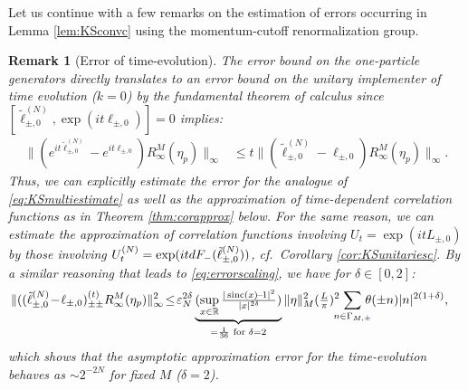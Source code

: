 \documentclass[a4paper, 11pt]{article}
\DeclareMathOperator{\1}{\mathds{1}}
\DeclareMathOperator{\sinc}{sinc}
\newtheorem{rem}[thm]{Remark}
\begin{document}
Let us continue with a few remarks on the estimation of errors occurring in Lemma \ref{lem:KSconvc} using the momentum-cutoff renormalization group.	
\begin{rem}[Error of time-evolution]
\label{rem:timeerror}
The error bound on the one-particle generators directly translates to an error bound on the unitary implementer of time evolution ($k=0$) by the fundamental theorem of calculus since $[\tilde{\ell}^{(N)}_{\pm,0},\exp(it\ell_{\pm,0})]=0$ implies:
\begin{align}
\label{eq:momrgestimatetime}
\|(e^{it\tilde{\ell}^{(N)}_{\pm,0}}-e^{it\ell_{\pm,0}})R^{M}_{\infty}(\eta_{p})\|_{\infty} & \leq t \|(\tilde{\ell}^{(N)}_{\pm,0}-\ell_{\pm,0})R^{M}_{\infty}(\eta_{p})\|_{\infty}.
\end{align}
Thus, we can explicitly estimate the error for the analogue of \eqref{eq:KSmultiestimate} as well as the approximation of time-dependent correlation functions as in Theorem \ref{thm:corapprox} below. For the same reason, we can estimate the approximation of correlation functions involving $U_{t}=\exp(itL_{\pm,0})$ by those involving $U^{(N)}_{t}=\exp(itdF_{{\color{blue}-}}(\tilde{\ell}^{(N)}_{\pm,0}))$, cf.~Corollary \ref{cor:KSunitariesc}. By a similar reasoning that leads to \eqref{eq:errorscaling}, we have for $\delta\in[0,2]$:
\begin{align}
\label{eq:momrgtimeerrorscaling}
\|((\tilde{\ell}^{(N)}_{\pm,0}\!-\!\ell_{\pm,0})^{(t)}_{\pm\pm}R^{M}_{\infty}(\eta_{p})\|_{\infty}^{2} & \!\leq\!\vep_{N}^{2\delta}\underbrace{(\sup_{x\in\R}\tfrac{|\sinc(x)\!-\!1|^{2}}{|x|^{2\delta}})}_{=\frac{1}{36}\textup{ for }\delta=2}\|\eta\|_{M}^{2}(\tfrac{L}{\pi})^{2}\!\!\!\!\sum_{n\in\Gamma_{M,{\color{blue}\pm}}}\!\!\!\!\theta(\pm n)|n|^{2(1+\delta)},
\end{align}
which shows that the asymptotic approximation error for the time-evolution behaves as $\sim 2^{-2N}$ for fixed $M$ ($\delta=2$).
\end{rem}
\end{document}
